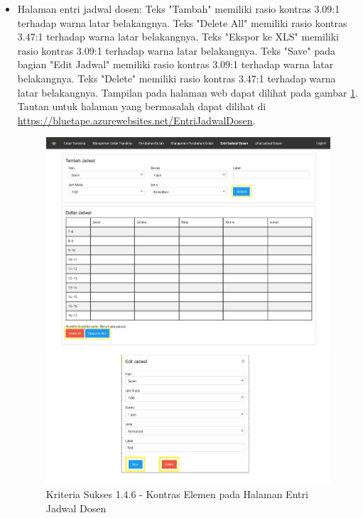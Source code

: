 \documentclass[a4paper,twoside]{article}
\begin{document}
\begin{enumerate}
\begin{itemize}
			\item Halaman entri jadwal dosen: Teks "Tambah" memiliki rasio kontras 3.09:1 terhadap warna latar belakangnya. Teks "Delete All" memiliki rasio kontras 3.47:1 terhadap warna latar belakangnya. Teks "Ekspor ke XLS" memiliki rasio kontras 3.09:1 terhadap warna latar belakangnya. Teks "Save" pada bagian "Edit Jadwal" memiliki rasio kontras 3.09:1 terhadap warna latar belakangnya. Teks "Delete" memiliki rasio kontras 3.47:1 terhadap warna latar belakangnya. Tampilan pada halaman web dapat dilihat pada gambar \ref{fig:1.4.6_contrast_enchanced_6}. Tautan untuk halaman yang bermasalah dapat dilihat di \url{https://bluetape.azurewebsites.net/EntriJadwalDosen}.
			\begin{figure}[H]
				\centering  
				\includegraphics[scale=0.3, frame]{kriteria-sukses-1-4-6-contrast-enchanced-6}  
				\caption[Kriteria Sukses 1.4.6 - Kontras Elemen pada Halaman Entri Jadwal Dosen]{Kriteria Sukses 1.4.6 - Kontras Elemen pada Halaman Entri Jadwal Dosen}
				\label{fig:1.4.6_contrast_enchanced_6}  
			\end{figure} 
			

\end{itemize}
\end{enumerate}
\end{document}
